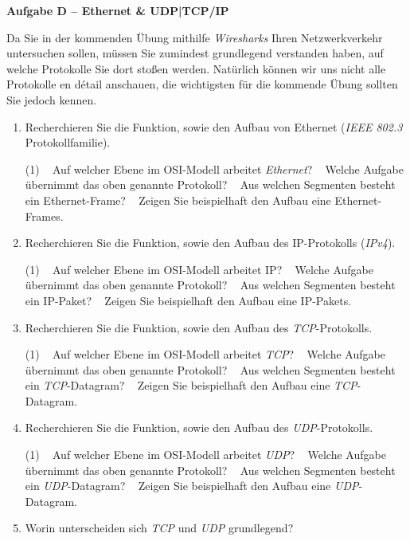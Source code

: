 \documentclass[paper=a4,fontsize=11pt]{scrartcl}%
\numberwithin{equation}{section}
\begin{document}
\begin{center}\Large{\textbf{Aufgabe D -- Ethernet \& UDP|TCP/IP}}\end{center}\vskip0.25in
Da Sie in der kommenden Übung mithilfe \emph{Wiresharks} Ihren Netzwerkverkehr untersuchen sollen, müssen Sie zumindest grundlegend verstanden haben, auf welche Protokolle Sie dort stoßen werden. Natürlich können wir uns nicht alle Protokolle en dé­tail anschauen, die wichtigsten für die kommende Übung sollten Sie jedoch kennen.
\begin{enumerate}
	\item Recherchieren Sie die Funktion, sowie den Aufbau von Ethernet (\emph{IEEE 802.3} Protokollfamilie).
	\begin{tasks}(1)
		\task~ Auf welcher Ebene im OSI-Modell arbeitet \emph{Ethernet}?
		\task~ Welche Aufgabe übernimmt das oben genannte Protokoll?
		\task~ Aus welchen Segmenten besteht ein Ethernet-Frame?
		\task~ Zeigen Sie beispielhaft den Aufbau eine Ethernet-Frames.
	\end{tasks}
	\item Recherchieren Sie die Funktion, sowie den Aufbau des IP-Protokolls (\emph{IPv4}).
	\begin{tasks}(1)
		\task~ Auf welcher Ebene im OSI-Modell arbeitet IP?
		\task~ Welche Aufgabe übernimmt das oben genannte Protokoll?
		\task~ Aus welchen Segmenten besteht ein IP-Paket?
		\task~ Zeigen Sie beispielhaft den Aufbau eine IP-Pakets.
	\end{tasks}
	\item Recherchieren Sie die Funktion, sowie den Aufbau des \emph{TCP}-Protokolls.
	\begin{tasks}(1)
		\task~ Auf welcher Ebene im OSI-Modell arbeitet \emph{TCP}?
		\task~ Welche Aufgabe übernimmt das oben genannte Protokoll?
		\task~ Aus welchen Segmenten besteht ein \emph{TCP}-Datagram?
		\task~ Zeigen Sie beispielhaft den Aufbau eine \emph{TCP}-Datagram.
	\end{tasks}
	\item Recherchieren Sie die Funktion, sowie den Aufbau des \emph{UDP}-Protokolls.
	\begin{tasks}(1)
		\task~ Auf welcher Ebene im OSI-Modell arbeitet \emph{UDP}?
		\task~ Welche Aufgabe übernimmt das oben genannte Protokoll?
		\task~ Aus welchen Segmenten besteht ein \emph{UDP}-Datagram?
		\task~ Zeigen Sie beispielhaft den Aufbau eine \emph{UDP}-Datagram.
	\end{tasks}
	\item Worin unterscheiden sich \emph{TCP} und \emph{UDP} grundlegend?
\end{enumerate}
\end{document}
